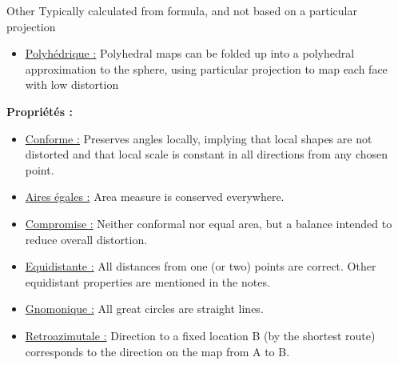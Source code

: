 \documentclass{article}
\begin{document}
\vspace{1\baselineskip}

Other
Typically calculated from formula, and not based on a particular projection

\begin{itemize}
    \item \underline{Polyhédrique :}
     Polyhedral maps can be folded up into a polyhedral approximation to the sphere, using 
        particular projection to map each 
        face with low distortion
\end{itemize}


\textbf{Propriétés :}

\begin{itemize}
    \item \underline{Conforme :} 
    Preserves angles locally, implying that local shapes are not 
        distorted and that local scale 
        is constant in all directions from any chosen point.
    \item \underline{Aires égales :}
        Area measure is conserved everywhere.
       
    \item \underline{Compromise :}
        Neither conformal nor equal
        area, but a balance intended to reduce overall distortion.
       
    \item \underline{Equidistante :}
         All 
        distances from one (or two) points are correct. Other equidistant properties are 
        mentioned in the notes.
       
    \item \underline{Gnomonique :}
        All great circles are straight lines.
        
    \item \underline{Retroazimutale :}
         Direction to a fixed location B (by the shortest route) corresponds to the direction on the 
        map from A to B.
        
\end{itemize}
\end{document}
